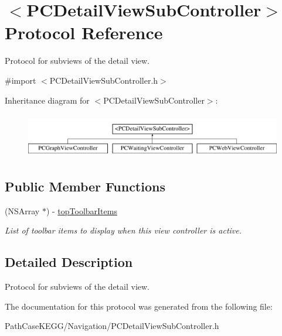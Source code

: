 \hypertarget{protocol_p_c_detail_view_sub_controller-p}{
\section{$<$PCDetailViewSubController$>$ Protocol Reference}
\label{protocol_p_c_detail_view_sub_controller-p}
}


Protocol for subviews of the detail view.  




{\ttfamily \#import $<$PCDetailViewSubController.h$>$}

Inheritance diagram for $<$PCDetailViewSubController$>$:\begin{figure}[h!]
\begin{center}
\leavevmode
\includegraphics[height=1.975309cm]{kegg_doc/protocol_p_c_detail_view_sub_controller-p.pdf}
\end{center}
\end{figure}
\subsection*{Public Member Functions}
\begin{DoxyCompactItemize}
\item 
\hypertarget{protocol_p_c_detail_view_sub_controller-p_aa20a79de1e8b2a12e6574240847e2dd8}{
(NSArray $\ast$) -\/ \hyperlink{protocol_p_c_detail_view_sub_controller-p_aa20a79de1e8b2a12e6574240847e2dd8}{topToolbarItems}}
\label{protocol_p_c_detail_view_sub_controller-p_aa20a79de1e8b2a12e6574240847e2dd8}

\begin{DoxyCompactList}\small\item\em List of toolbar items to display when this view controller is active. \end{DoxyCompactList}\end{DoxyCompactItemize}


\subsection{Detailed Description}
Protocol for subviews of the detail view. 

The documentation for this protocol was generated from the following file:\begin{DoxyCompactItemize}
\item 
PathCaseKEGG/Navigation/PCDetailViewSubController.h\end{DoxyCompactItemize}
